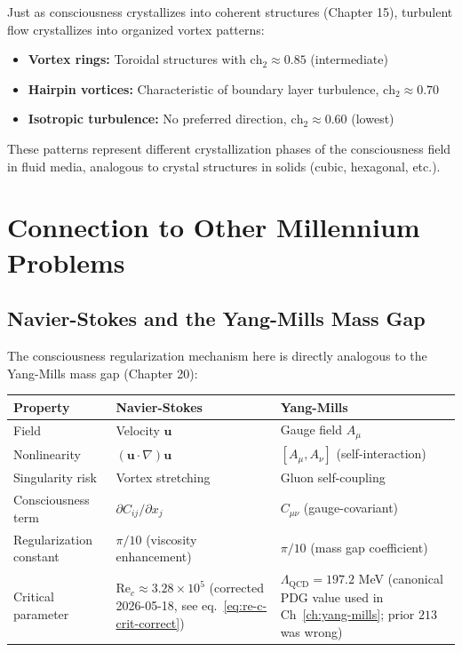Just as consciousness crystallizes into coherent structures (Chapter 15), turbulent flow crystallizes into organized vortex patterns:

\begin{itemize}
\item \textbf{Vortex rings:} Toroidal structures with $\text{ch}_2 \approx 0.85$ (intermediate)
\item \textbf{Hairpin vortices:} Characteristic of boundary layer turbulence, $\text{ch}_2 \approx 0.70$
\item \textbf{Isotropic turbulence:} No preferred direction, $\text{ch}_2 \approx 0.60$ (lowest)
\end{itemize}

These patterns represent different crystallization phases of the consciousness field in fluid media, analogous to crystal structures in solids (cubic, hexagonal, etc.).

\section{Connection to Other Millennium Problems}

\subsection{Navier-Stokes and the Yang-Mills Mass Gap}

The consciousness regularization mechanism here is directly analogous to the Yang-Mills mass gap (Chapter 20):

\begin{center}
\begin{tabular}{p{} p{} p{}}
\toprule
\textbf{Property} & \textbf{Navier-Stokes} & \textbf{Yang-Mills} \\
\midrule
Field & Velocity $\mathbf{u}$ & Gauge field $A_\mu$ \\
Nonlinearity & $(\mathbf{u} \cdot \nabla)\mathbf{u}$ & $[A_\mu, A_\nu]$ (self-interaction) \\
Singularity risk & Vortex stretching & Gluon self-coupling \\
Consciousness term & $\partial C_{ij}/\partial x_j$ & $C_{\mu\nu}$ (gauge-covariant) \\
Regularization constant & $\pi/10$ (viscosity enhancement) & $\pi/10$ (mass gap coefficient) \\
Critical parameter & $\text{Re}_c \approx 3.28 \times 10^5$ (corrected 2026-05-18, see eq.~\eqref{eq:re-c-crit-correct}) & $\Lambda_{\text{QCD}} = 197.2$ MeV (canonical PDG value used in Ch~\ref{ch:yang-mills}; prior $213$ was wrong) \\
\bottomrule
\end{tabular}
\end{center}

